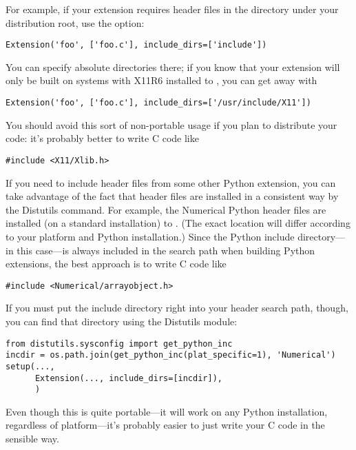 \documentclass{manual}
\begin{document}
For example, if your extension requires header files in the
 directory under your distribution root, use the
 option:

\begin{verbatim}
Extension('foo', ['foo.c'], include_dirs=['include'])
\end{verbatim}

You can specify absolute directories there; if you know that your
extension will only be built on \UNIX{} systems with X11R6 installed to
, you can get away with

\begin{verbatim}
Extension('foo', ['foo.c'], include_dirs=['/usr/include/X11'])
\end{verbatim}

You should avoid this sort of non-portable usage if you plan to
distribute your code: it's probably better to write C code like
\begin{verbatim}
#include <X11/Xlib.h>
\end{verbatim}

If you need to include header files from some other Python extension,
you can take advantage of the fact that header files are installed in a
consistent way by the Distutils  command.  For
example, the Numerical Python header files are installed (on a standard
\UNIX{} installation) to .
(The exact location will differ according to your platform and Python
installation.)  Since the Python include
directory--- in this case---is always
included in the search path when building Python extensions, the best
approach is to write C code like
\begin{verbatim}
#include <Numerical/arrayobject.h>
\end{verbatim}
If you must put the  include directory right into your
header search path, though, you can find that directory using the
Distutils  module:

\begin{verbatim}
from distutils.sysconfig import get_python_inc
incdir = os.path.join(get_python_inc(plat_specific=1), 'Numerical')
setup(...,
      Extension(..., include_dirs=[incdir]),
      )
\end{verbatim}

Even though this is quite portable---it will work on any Python
installation, regardless of platform---it's probably easier to just
write your C code in the sensible way.
\end{document}

